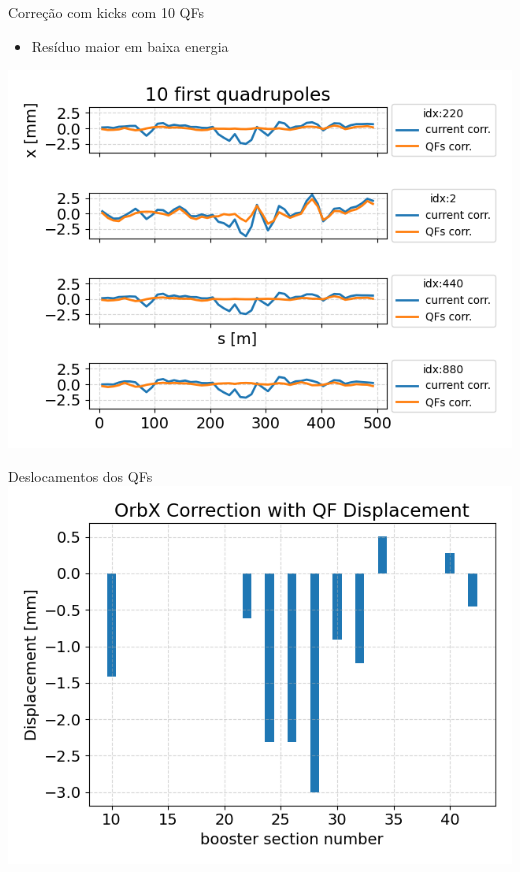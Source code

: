 \documentclass[1611]{beamer}            %
\begin{document}
\begin{frame}{Correção com kicks com 10 QFs}
\vspace{0.5cm}
\begin{itemize}
    \item Resíduo maior em baixa energia
\vspace{0.5cm}
\end{itemize}
\centering
    \includegraphics[scale=0.5]{2024-05-10/figures/bo-cod-corr-ramp.png}
\end{frame}

\begin{frame}{Deslocamentos dos QFs}
\vspace{0.5cm}
\centering
    \includegraphics[scale=0.5]{2024-05-10/figures/qfs-displacements.png}
\end{frame}

\end{document}
